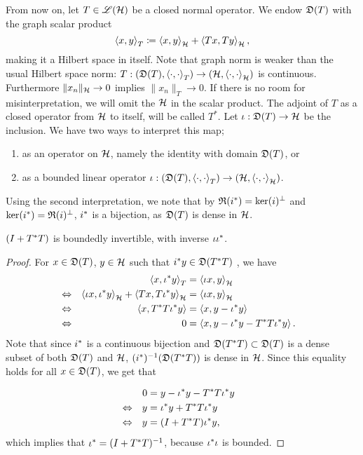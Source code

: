 From now on, let $T \in \mathscr{L}(\mathcal{H})$ be a closed normal operator. 
We endow $\mathfrak{D}(T)$ with the graph scalar product
\[
 \left\langle x,y \right\rangle_T \coloneqq  \left\langle x, y \right\rangle_{\mathcal{H}} + \left\langle  Tx, Ty \right\rangle_{\mathcal{H}},
\]
making it a Hilbert space in itself. Note that graph norm is weaker than the
usual Hilbert space norm: 
$T : ( \mathfrak{D}(T) , \left\langle \cdot, \cdot \right\rangle_T) \to ( \mathcal{H} , \left\langle \cdot, \cdot \right\rangle_{\mathcal{H}})$
is continuous. Furthermore $\|x_n\|_{\mathcal{H}} \to 0$ implies $  \| x_n\|_T \to 0$.
If there is no room for misinterpretation,
we will omit the $\mathcal{H}$ in the scalar product. The adjoint of $T$ as a closed 
operator from $\mathcal{H}$ to itself, will be called $T^*$. 
Let $\iota : \mathfrak{D}(T) \to \mathcal{H}$ be the inclusion.
We have two ways to interpret this map;
\begin{enumerate}
 \item as an operator on $\mathcal{H}$, namely the identity with domain $\mathfrak{D}(T)$, or
 \item as a bounded linear operator $\iota : ( \mathfrak{D}(T) , \left\langle \cdot, \cdot \right\rangle_T)
 \to ( \mathcal{H} , \left\langle \cdot, \cdot \right\rangle_{\mathcal{H}})$.
\end{enumerate}
Using the second interpretation, we note that by $\mathfrak{R}(i^{*}) = \ker(i)^\perp$
and $\ker(i^{*}) = \mathfrak{R}(i)^\perp$, $i^{*}$ is a bijection, as $\mathfrak{D}(T)$ is 
dense in $\mathcal{H}$.
\begin{prop}
 $(I + T ^{*} T)$ is boundedly
 invertible, with inverse $\iota \iota ^{*}$.
\end{prop}
\begin{proof}
  For $x \in \mathfrak{D}(T)$, $y \in \mathcal{H}$ such that $i ^{*} y \in \mathfrak{D}(T^{*} T)$
  ,  we have
  \begin{align*}
  &\quad & \left\langle x, \iota ^{*} y \right\rangle_T &= \left\langle \iota x, y \right\rangle_{\mathcal{H}}  &\\
  &\Leftrightarrow & \left\langle \iota x ,\iota ^{*} y \right\rangle_{\mathcal{H}} +
  \left\langle Tx, T\iota ^{*} y \right\rangle_{\mathcal{H}} 
  &= \left\langle \iota x, y \right\rangle_{\mathcal{H}}  &\\
  &\Leftrightarrow & \left\langle x, T ^* T \iota ^{*} y \right\rangle &= \left\langle x, y - \iota ^{*} y \right\rangle&\\
  &\Leftrightarrow & 0 &= \left\langle x, y - \iota ^{*} y - T ^* T \iota ^{*} y \right\rangle. & 
  \end{align*}
  Note that since $i ^{*}$ is a continuous bijection and $\mathfrak{D}(T ^{*} T)
  \subset \mathfrak{D}(T)$ is a
  dense subset of both $\mathfrak{D}(T)$ and $\mathcal{H}$, $(i ^{*}) ^{-1} (\mathfrak{D}(T ^{*} T))$ is dense
  in $\mathcal{H}$. Since this equality holds for all $x \in \mathfrak{D}(T)$, we get that 

  \begin{align*}
  & \quad & 0&= y - \iota ^{*} y - T ^* T \iota ^{*} y  & \\
  & \Leftrightarrow  & y &= \iota ^{*} y + T ^{*} T \iota ^{*} y& \\
  & \Leftrightarrow & y &= (I + T ^{*} T) \iota ^{*} y, &
  \end{align*}
  which implies that $  \iota ^{*} = ( I + T ^{*} T) ^{-1}$,
  because $\iota ^{*} \iota$ is bounded.
\end{proof}

